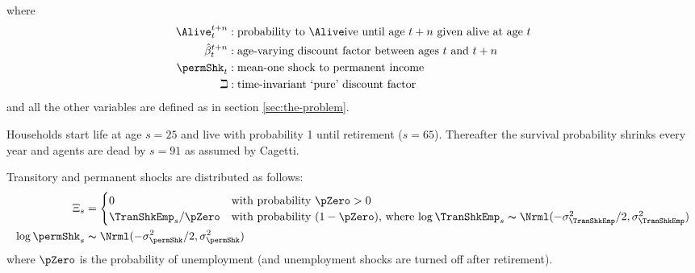 where
  \begin{equation*}\begin{gathered}\begin{aligned}
        \Alive _{\prd}^{t+n} &:\text{probability to }\Alive\text{ive until age $t+n$ given alive at age $t$}
        \\      \hat{\DiscFac}_{\prd}^{t+n} &:\text{age-varying discount factor between ages $t$ and $t+n$}
        \\     \permShk_{\prd} &:\text{mean-one shock to permanent income}
        \\     \beth &:\text{time-invariant `pure' discount factor}
      \end{aligned}\end{gathered}\end{equation*}
and all the other variables are defined as in section \ref{sec:the-problem}.

Households start life at age $s=25$ and live with probability 1 until retirement
($s=65$). Thereafter the survival probability shrinks every year and
agents are dead by $s=91$ as assumed by Cagetti. %

  Transitory and permanent shocks are distributed as follows:
  \begin{equation}\begin{gathered}\begin{aligned}
        \Xi_{s} & =
        \begin{cases}
          0\phantom{/\pZero} & \text{with probability $\pZero>0$} \\
          \TranShkEmp_{s}/\pZero      & \text{with probability $(1-\pZero)$, where $\log \TranShkEmp_{s}\thicksim \Nrml(-\sigma_{\TranShkEmp}^{2}/2,\sigma_{\TranShkEmp}^{2})$}\\
        \end{cases}\\
        \log \permShk_{s} &\thicksim \Nrml(-\sigma_{\permShk}^{2}/2,\sigma_{\permShk}^{2})
      \end{aligned}\end{gathered}\end{equation}
  where $\pZero$ is the probability of unemployment (and unemployment shocks are turned off after retirement).

